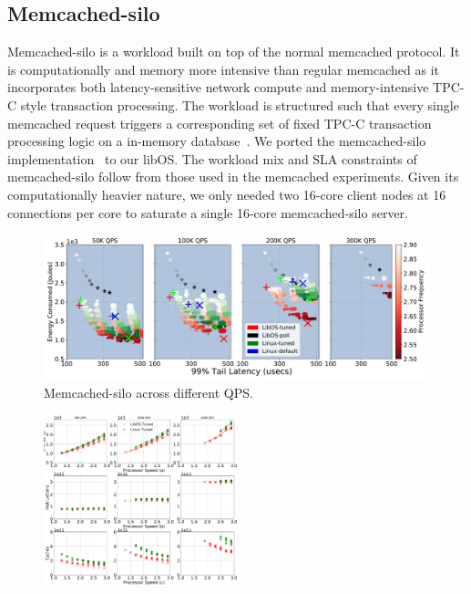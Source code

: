 \subsection{Memcached-silo}
\label{sec:mcdsilo}

Memcached-silo is a workload built on top of the normal memcached protocol. It is computationally and memory more intensive than regular memcached as it incorporates both latency-sensitive network compute and memory-intensive TPC-C style transaction processing. The workload is structured such that every single memcached request triggers a corresponding set of fixed TPC-C transaction processing logic on a in-memory database~\cite{silo}. We ported the memcached-silo implementation~\cite{mcdsilo, zygos} to our libOS. The workload mix and SLA constraints of memcached-silo follow from those used in the memcached experiments. Given its computationally heavier nature, we only needed two 16-core client nodes at 16 connections per core to saturate a single 16-core memcached-silo server. 

\begin{figure}
\centering
\includegraphics[width=1\textwidth]{figures/mcdsilo_overview}
\caption[]
{Memcached-silo across different QPS.}
\label{fig:mcdsilo_overview}
\end{figure}

\begin{figure}
\includegraphics[width=0.5\textwidth]{figures/mcdsilo_detail}
\caption[]{}
\label{fig:mcdsilo_detail}
\end{figure}

